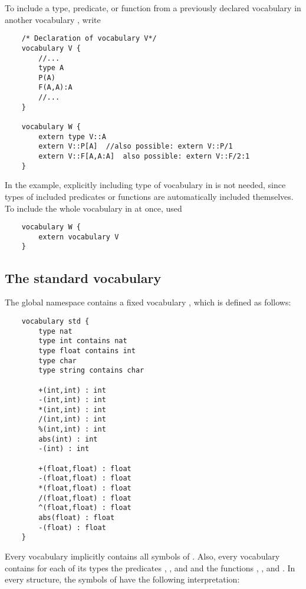 \documentclass[a4]{article}
\begin{document}
To include a type, predicate, or function from a previously declared vocabulary  in another vocabulary , write
\begin{lstlisting}
	/* Declaration of vocabulary V*/
	vocabulary V {
		//...
		type A
		P(A)
		F(A,A):A
		//...
	}

	vocabulary W {
		extern type V::A
		extern V::P[A]	//also possible: extern V::P/1
		extern V::F[A,A:A]	also possible: extern V::F/2:1
	}
\end{lstlisting}

In the example, explicitly including type  of vocabulary  in  is not needed, since types of included predicates or functions are automatically included themselves.  To include the whole vocabulary  in  at once, used
\begin{lstlisting}
	vocabulary W {
		extern vocabulary V
	}
\end{lstlisting}




\subsection{The standard vocabulary}

The global namespace contains a fixed vocabulary , which is defined as follows:

\begin{lstlisting}
	vocabulary std {
		type nat	
		type int contains nat
		type float contains int
		type char
		type string contains char

		+(int,int) : int
		-(int,int) : int
		*(int,int) : int
		/(int,int) : int
		%(int,int) : int
		abs(int) : int
		-(int) : int
		
		+(float,float) : float
		-(float,float) : float
		*(float,float) : float
		/(float,float) : float
		^(float,float) : float
		abs(float) : float
		-(float) : float
	}
\end{lstlisting}
Every vocabulary implicitly contains all symbols of .  Also, every vocabulary contains for each of its types  the predicates , , and  and the functions , ,  and . In every structure, the symbols of  have the following interpretation:
\end{document}
